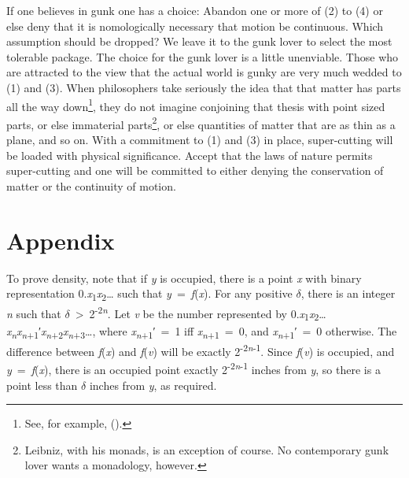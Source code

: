 \documentclass[
  11pt,
  letterpaper,
  DIV=11,
  numbers=noendperiod,
  twoside]{scrartcl}
\begin{document}
If one believes in gunk one has a choice: Abandon one or more of (2) to
(4) or else deny that it is nomologically necessary that motion be
continuous. Which assumption should be dropped? We leave it to the gunk
lover to select the most tolerable package. The choice for the gunk
lover is a little unenviable. Those who are attracted to the view that
the actual world is gunky are very much wedded to (1) and (3). When
philosophers take seriously the idea that that matter has parts all the
way down\footnote{See, for example,
  ().}, they do not imagine
conjoining that thesis with point sized parts, or else immaterial
parts\footnote{Leibniz, with his monads, is an exception of course. No
  contemporary gunk lover wants a monadology, however.}, or else
quantities of matter that are as thin as a plane, and so on. With a
commitment to (1) and (3) in place, super-cutting will be loaded with
physical significance. Accept that the laws of nature permits
super-cutting and one will be committed to either denying the
conservation of matter or the continuity of motion.

\section*{Appendix}\label{appendix}

To prove density, note that if \emph{y} is occupied, there is a point
\emph{x} with binary representation
0.\emph{x}\textsubscript{1}\emph{x}\textsubscript{2}\ldots{} such that
\emph{y}~=~\emph{f}(\emph{x}). For any positive \({\delta}\), there is
an integer \emph{n} such that
\({\delta}\)~\textgreater~2\textsuperscript{-2\emph{n}}. Let \emph{v} be
the number represented by
0.\emph{x}\textsubscript{1}\emph{x}\textsubscript{2}\ldots{}\emph{x\textsubscript{n}x\textsubscript{n}}\textsubscript{+1}′\emph{x\textsubscript{n}}\textsubscript{+2}\emph{x\textsubscript{n}}\textsubscript{+3}\ldots,
where \emph{x\textsubscript{n}}\textsubscript{+1}′~=~1 iff
\emph{x\textsubscript{n}}\textsubscript{+1}~=~0, and
\emph{x\textsubscript{n}}\textsubscript{+1}′~=~0 otherwise. The
difference between \emph{f}(\emph{x}) and \emph{f}(\emph{v}) will be
exactly 2\textsuperscript{-2\emph{n}-1}. Since \emph{f}(\emph{v}) is
occupied, and \emph{y}~=~\emph{f}(\emph{x}), there is an occupied point
exactly 2\textsuperscript{-2\emph{n}-1} inches from \emph{y}, so there
is a point less than \({\delta}\) inches from \emph{y}, as required.
\end{document}
